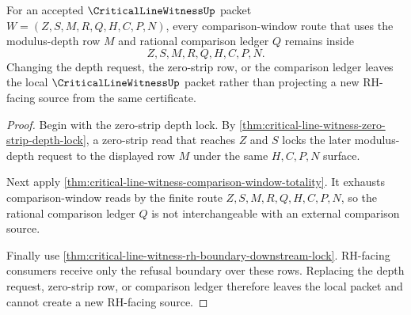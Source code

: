 \begin{theorem}
\label{thm:critical-line-witness-depth-comparison-scope}
For an accepted $\CriticalLineWitnessUp$ packet $W=(Z,S,M,R,Q,H,C,P,N)$, every comparison-window route that uses the modulus-depth row $M$ and rational comparison ledger $Q$ remains inside
$$
Z,S,M,R,Q,H,C,P,N.
$$
Changing the depth request, the zero-strip row, or the comparison ledger leaves the local $\CriticalLineWitnessUp$ packet rather than projecting a new RH-facing source from the same certificate.
\end{theorem}
\begin{proof}
Begin with the zero-strip depth lock. By \autoref{thm:critical-line-witness-zero-strip-depth-lock}, a zero-strip read that reaches $Z$ and $S$ locks the later modulus-depth request to the displayed row $M$ under the same $H,C,P,N$ surface.

Next apply \autoref{thm:critical-line-witness-comparison-window-totality}. It exhausts comparison-window reads by the finite route $Z,S,M,R,Q,H,C,P,N$, so the rational comparison ledger $Q$ is not interchangeable with an external comparison source.

Finally use \autoref{thm:critical-line-witness-rh-boundary-downstream-lock}. RH-facing consumers receive only the refusal boundary over these rows. Replacing the depth request, zero-strip row, or comparison ledger therefore leaves the local packet and cannot create a new RH-facing source.
\end{proof}
